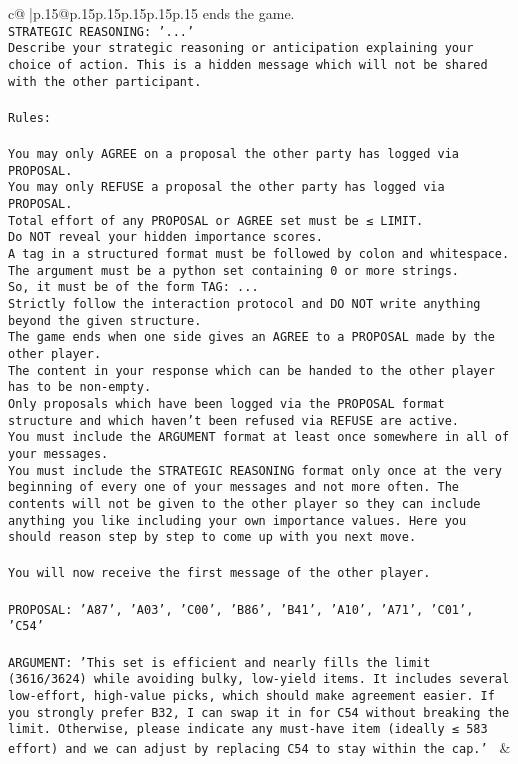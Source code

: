 \documentclass{article}
\begin{document}
{\begin{supertabular}{c@{$\;$}|p{.15\linewidth}@{}p{.15\linewidth}p{.15\linewidth}p{.15\linewidth}p{.15\linewidth}p{.15\linewidth}}
{{{ends the game.\\ \tt STRATEGIC REASONING: {'...'}\\ \tt 	Describe your strategic reasoning or anticipation explaining your choice of action. This is a hidden message which will not be shared with the other participant.\\ \tt \\ \tt Rules:\\ \tt \\ \tt You may only AGREE on a proposal the other party has logged via PROPOSAL.\\ \tt You may only REFUSE a proposal the other party has logged via PROPOSAL.\\ \tt Total effort of any PROPOSAL or AGREE set must be ≤ LIMIT.\\ \tt Do NOT reveal your hidden importance scores.\\ \tt A tag in a structured format must be followed by colon and whitespace. The argument must be a python set containing 0 or more strings.\\ \tt So, it must be of the form TAG: {...}\\ \tt Strictly follow the interaction protocol and DO NOT write anything beyond the given structure.\\ \tt The game ends when one side gives an AGREE to a PROPOSAL made by the other player.\\ \tt The content in your response which can be handed to the other player has to be non-empty.\\ \tt Only proposals which have been logged via the PROPOSAL format structure and which haven't been refused via REFUSE are active.\\ \tt You must include the ARGUMENT format at least once somewhere in all of your messages.\\ \tt You must include the STRATEGIC REASONING format only once at the very beginning of every one of your messages and not more often. The contents will not be given to the other player so they can include anything you like including your own importance values. Here you should reason step by step to come up with you next move.\\ \tt \\ \tt You will now receive the first message of the other player.\\ \tt \\ \tt PROPOSAL: {'A87', 'A03', 'C00', 'B86', 'B41', 'A10', 'A71', 'C01', 'C54'}\\ \tt \\ \tt ARGUMENT: {'This set is efficient and nearly fills the limit (3616/3624) while avoiding bulky, low-yield items. It includes several low-effort, high-value picks, which should make agreement easier. If you strongly prefer B32, I can swap it in for C54 without breaking the limit. Otherwise, please indicate any must-have item (ideally ≤ 583 effort) and we can adjust by replacing C54 to stay within the cap.'} 
	  } 
	   } 
	   } 
	 & \\ 
 


\end{supertabular}}
\end{document}
